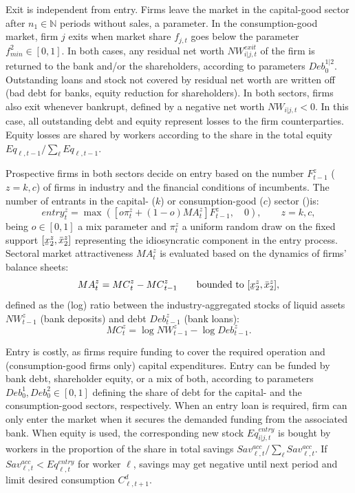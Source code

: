 \documentclass[a4paper,11pt]{article}
\newcommand\munderbar[1]{%
	\underaccent{\bar}{#1}}
\begin{document}
\begin{appendices}
Exit is independent from entry. Firms leave the market in the capital-good sector after $n_1 \in \mathbb{N}$ periods without sales, a parameter. In the consumption-good market, firm $j$ exits when market share $f_{j,t}$ goes below the parameter $f_{min}^2 \in [0, 1]$. In both cases, any residual net worth $NW_{i|j,t}^{exit}$ of the firm is returned to the bank and/or the shareholders, according to parameters $Deb_0^{1|2}$. Outstanding loans and stock not covered by residual net worth are written off (bad debt for banks, equity reduction for shareholders). In both sectors, firms also exit whenever bankrupt, defined by a negative net worth $NW_{i|j,t} < 0$. In this case, all outstanding debt and equity represent losses to the firm counterparties. Equity losses are shared by workers according to the share in the total equity $Eq_{\ell,t-1} / \sum_\ell{ Eq_{\ell,t-1} }$.

Prospective firms in both sectors decide on entry based on the number $F_{t-1}^z$ ($z=k,c$) of firms in industry and the financial conditions of incumbents. The number of entrants in the capital- ($k$) or consumption-good ($c$) sector ()is:
\begin{equation}
	{entry}_t^z =\max \left( \left[ o \pi_t^z + ( 1 - o ) {MA}_t^z \right] F_{t-1}^z, \quad 0 \right), \qquad z=k,c,
\end{equation}
being $o \in [0, 1]$ a mix parameter and $\pi_t^z$ a uniform random draw on the fixed support $[\munderbar{x}_2^z,\bar{x}_2^z]$ representing the idiosyncratic component in the entry process. Sectoral market attractiveness ${MA}_t^z$ is evaluated based on the dynamics of firms' balance sheets:
\begin{equation}
	{MA}_t^z = {MC}_t^z - {MC}_{t-1}^z\qquad \text{bounded to } [\munderbar{x}_2^z,\bar{x}_2^z],
\end{equation}
defined as the (log) ratio between the industry-aggregated stocks of liquid assets $NW_{t-1}^z$ (bank deposits) and debt $Deb_{t-1}^z$ (bank loans):
\begin{equation}
	{MC}_t^z = \log NW_{t-1}^z - \log Deb_{t-1}^z.
\end{equation}

Entry is costly, as firms require funding to cover the required operation and (consumption-good firms only) capital expenditures. Entry can be funded by bank debt, shareholder equity, or a mix of both, according to parameters $Deb_0^1, Deb_0^2 \in [0, 1]$ defining the share of debt for the capital- and the consumption-good sectors, respectively. When an entry loan is required, firm can only enter the market when it secures the demanded funding from the associated bank. When equity is used, the corresponding new stock $Eq_{i|j,t}^{entry}$ is bought by workers in the proportion of the share in total savings $Sav_{\ell,t}^{acc} / \sum_\ell{ Sav_{\ell,t}^{acc} }$. If $Sav_{\ell,t}^{acc} < Eq_{\ell,t}^{entry}$ for worker $\ell$, savings may get negative until next period and limit desired consumption $C_{\ell,t+1}^d$.



\end{appendices}
\end{document}
